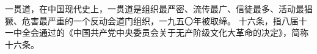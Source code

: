 \begin{maonote}
一贯道，在中国现代史上，一贯道是组织最严密、流传最广、信徒最多、活动最猖獗、危害最严重的一个反动会道门组织，一九五〇年被取缔。
十六条，指八届十一中全会通过的《中国共产党中央委员会关于无产阶级文化大革命的决定》，简称十六条。
\end{maonote}
